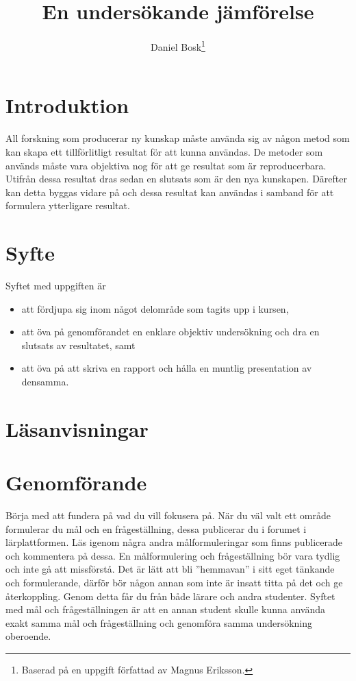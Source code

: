\documentclass[a4paper]{miunasgn}
\title{En undersökande jämförelse}
\author{Daniel Bosk\thanks{%
		Baserad på en uppgift författad av Magnus Eriksson.
	}
}
\date{\svnId}
\begin{document}
\maketitle
\thispagestyle{foot}
\tableofcontents


\section{Introduktion}
\noindent
All forskning som producerar ny kunskap måste använda sig av någon metod som 
kan skapa ett tillförlitligt resultat för att kunna användas.
De metoder som används måste vara objektiva nog för att ge resultat som är 
reproducerbara.
Utifrån dessa resultat dras sedan en slutsats som är den nya kunskapen.
Därefter kan detta byggas vidare på och dessa resultat kan användas i samband 
för att formulera ytterligare resultat.


\section{Syfte}
\noindent
Syftet med uppgiften är
\begin{itemize}
	\item att fördjupa sig inom något delområde som tagits upp i kursen,
	\item att öva på genomförandet en enklare objektiv undersökning och dra en 
		slutsats av resultatet, samt
	\item att öva på att skriva en rapport och hålla en muntlig presentation av 
		densamma.
\end{itemize}


\section{Läsanvisningar}
\noindent



\section{Genomförande}
\noindent
Börja med att fundera på vad du vill fokusera på.
När du väl valt ett område formulerar du mål och en frågeställning, dessa 
publicerar du i forumet i lärplattformen.
Läs igenom några andra målformuleringar som finns publicerade och kommentera på 
dessa.
En målformulering och frågeställning bör vara tydlig och inte gå att 
missförstå.
Det är lätt att bli ''hemmavan'' i sitt eget tänkande och formulerande, därför 
bör någon annan som inte är insatt titta på det och ge återkoppling.
Genom detta får du från både lärare och andra studenter.
Syftet med mål och frågeställningen är att en annan student skulle kunna 
använda exakt samma mål och frågeställning och genomföra samma undersökning 
oberoende.
\end{document}
